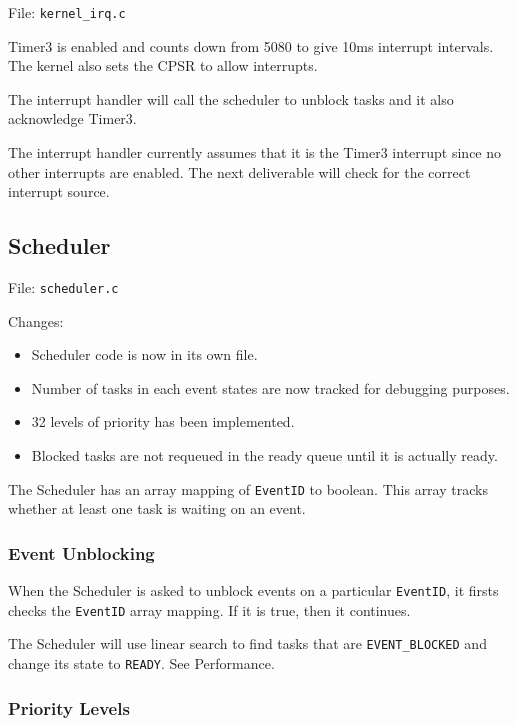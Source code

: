 \documentclass[letterpaper]{article}
\begin{document}
File: \texttt{kernel\_irq.c}

Timer3 is enabled and counts down from 5080 to give 10ms interrupt intervals. The kernel also sets the CPSR to allow interrupts.

The interrupt handler will call the scheduler to unblock tasks and it also acknowledge Timer3.

The interrupt handler currently assumes that it is the Timer3 interrupt since no other interrupts are enabled. The next deliverable will check for the correct interrupt source.


\subsection{Scheduler%
  \label{scheduler}%
}

File: \texttt{scheduler.c}

Changes:
%
\begin{itemize}

\item Scheduler code is now in its own file.

\item Number of tasks in each event states are now tracked for debugging purposes.

\item 32 levels of priority has been implemented.

\item Blocked tasks are not requeued in the ready queue until it is actually ready.

\end{itemize}

The Scheduler has an array mapping of \texttt{EventID} to boolean. This array tracks whether at least one task is waiting on an event.


\subsubsection{Event Unblocking%
  \label{event-unblocking}%
}

When the Scheduler is asked to unblock events on a particular \texttt{EventID}, it firsts checks the \texttt{EventID} array mapping. If it is true, then it continues.

The Scheduler will use linear search to find tasks that are \texttt{EVENT\_BLOCKED} and change its state to \texttt{READY}. See Performance.


\subsubsection{Priority Levels%
  \label{priority-levels}%
}
\end{document}
